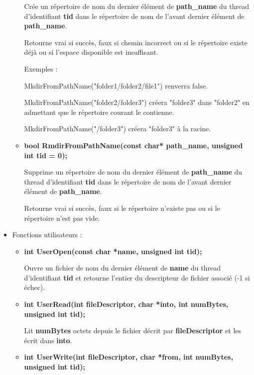 \documentclass{article}
\begin{document}
\begin{itemize}
\begin{itemize}
  Crée un répertoire de nom du dernier élément de \textbf{path\_name} du thread d'identifiant \textbf{tid} dans le répertoire de nom de l'avant dernier élément de  \textbf{path\_name}.
  
  Retourne vrai si succès, faux si chemin incorrect ou si le répertoire existe déjà ou si l'espace disponible est insuffisant.
  
  Exemples :
    
  MkdirFromPathName("folder1/folder2/file1") renverra false.
  
  MkdirFromPathName("folder2/folder3") créera "folder3" dans "folder2" en admettant que le répertoire courant le contienne.
  
  MkdirFromPathName("/folder3") créera "folder3" à la racine.

 	\item 
 	\textbf{bool RmdirFromPathName(const char* path\_name, unsigned int tid = 0);}
  
  Supprime un répertoire de nom du dernier élément de \textbf{path\_name} du thread d'identifiant \textbf{tid} dans le répertoire de nom de l'avant dernier élément de  \textbf{path\_name}.
  
  Retourne vrai si succès, faux si le répertoire n'existe pas ou si le répertoire n'est pas vide.  


\end{itemize}

\item

Fonctions utilisateurs :

\begin{itemize}
  
	\item
    \textbf{int UserOpen(const char *name, unsigned int tid);}
  
	Ouvre un fichier de nom du dernier élément de \textbf{name} du thread d'identifiant \textbf{tid} et retourne l'entier du descripteur de fichier associé (-1 si échec).

	\item
    \textbf{int UserRead(int fileDescriptor, char *into, int numBytes, unsigned int tid);}

	Lit \textbf{numBytes} octets depuis le fichier décrit par \textbf{fileDescriptor} et les écrit dans \textbf{into}.

    \item
    \textbf{int UserWrite(int fileDescriptor, char *from, int numBytes, unsigned int tid);}
    

\end{itemize}
\end{itemize}
\end{document}

